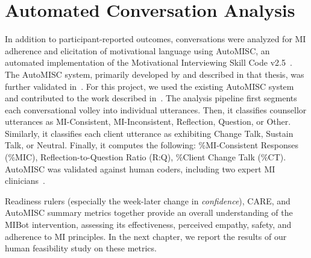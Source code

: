 \section{Automated Conversation Analysis}
\label{subsec:automisc}
In addition to participant-reported outcomes, conversations were analyzed for MI adherence and elicitation of motivational language using AutoMISC, an automated implementation of the Motivational Interviewing Skill Code v2.5~\citep{Houck2010}. The AutoMISC system, primarily developed by \citet{ali2025thesis} and described in that thesis, was further validated in~\citep{ali2025automated}. For this project, we used the existing AutoMISC system and contributed to the work described in~\citep{mahmood-etal-2025-fully}. The analysis pipeline first segments each conversational volley into individual utterances. Then, it classifies counsellor utterances as MI-Consistent, MI-Inconsistent, Reflection, Question, or Other. Similarly, it classifies each client utterance as exhibiting Change Talk, Sustain Talk, or Neutral. Finally, it computes the following: \%MI-Consistent Responses (\%MIC), Reflection-to-Question Ratio (R:Q), \%Client Change Talk (\%CT). AutoMISC was validated against human coders, including two expert MI clinicians~\citep{mahmood-etal-2025-fully}.

Readiness rulers (especially the week-later change in \emph{confidence}), CARE, and AutoMISC summary metrics together provide an overall understanding of the MIBot intervention, assessing its effectiveness, perceived empathy, safety, and adherence to MI principles. In the next chapter, we report the results of our human feasibility study on these metrics.
